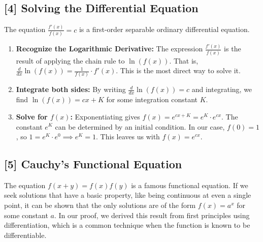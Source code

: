 \documentclass[11pt,a4paper]{article}
\begin{document}
\hypertarget{note:ode}{\subsection*{[4] Solving the Differential Equation}}
The equation $\frac{f'(x)}{f(x)} = c$ is a first-order separable ordinary differential equation.
\begin{enumerate}
    \item \textbf{Recognize the Logarithmic Derivative:} The expression $\frac{f'(x)}{f(x)}$ is the result of applying the chain rule to $\ln(f(x))$. That is, $\frac{d}{dx}\ln(f(x)) = \frac{1}{f(x)} \cdot f'(x)$. This is the most direct way to solve it.
    \item \textbf{Integrate both sides:} By writing $\frac{d}{dx}\ln(f(x)) = c$ and integrating, we find $\ln(f(x)) = cx + K$ for some integration constant $K$.
    \item \textbf{Solve for $f(x)$:} Exponentiating gives $f(x) = e^{cx+K} = e^K \cdot e^{cx}$. The constant $e^K$ can be determined by an initial condition. In our case, $f(0)=1$, so $1 = e^K \cdot e^0 \implies e^K = 1$. This leaves us with $f(x)=e^{cx}$.
\end{enumerate}

\hypertarget{note:cauchy}{\subsection*{[5] Cauchy's Functional Equation}}
The equation $f(x+y) = f(x)f(y)$ is a famous functional equation. If we seek solutions that have a basic property, like being continuous at even a single point, it can be shown that the only solutions are of the form $f(x) = a^x$ for some constant $a$. In our proof, we derived this result from first principles using differentiation, which is a common technique when the function is known to be differentiable.
\end{document}
